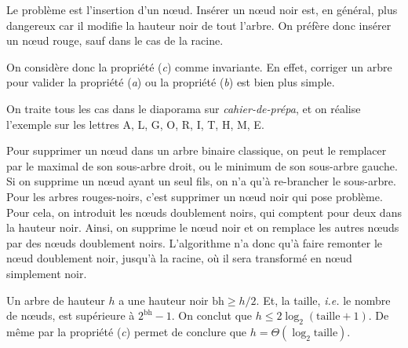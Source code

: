 {{		Le problème est l'insertion d'un nœud.
		Insérer un nœud noir est, en général, plus dangereux car il modifie la hauteur noir de tout l'arbre.
		On préfère donc insérer un nœud rouge, sauf dans le cas de la racine.
	
		On considère donc la propriété (\textit{c}) comme invariante. En effet, corriger un arbre pour valider la propriété (\textit{a}) ou la propriété (\textit{b}) est bien plus simple.
	
		On traite tous les cas dans le diaporama sur \textit{cahier-de-prépa}, et on réalise l'exemple sur les lettres A, L, G, O, R, I, T, H, M, E.
	
		\bigskip
		
		Pour supprimer un nœud dans un arbre binaire classique, on peut le remplacer par le maximal de son sous-arbre droit, ou le minimum de son sous-arbre gauche. Si on supprime un nœud ayant un seul fils, on n'a qu'à re-brancher le sous-arbre.
		Pour les arbres rouges-noirs, c'est supprimer un nœud noir qui pose problème.
		Pour cela, on introduit les nœuds doublement noirs, qui comptent pour deux dans la hauteur noir.
		Ainsi, on supprime le nœud noir et on remplace les autres nœuds par des nœuds doublement noirs.
		L'algorithme n'a donc qu'à faire remonter le nœud doublement noir, jusqu'à la racine, où il sera transformé en nœud simplement noir.
	
		Un arbre de hauteur $h$ a une hauteur noir $\mathrm{bh} \ge h / 2$. Et, la taille, \textit{i.e.} le nombre de nœuds, est supérieure à $2^{\mathrm{bh}} - 1$.
		On conclut que $h \le 2 \log_2(\mathrm{taille} + 1)$.
		De même par la propriété (\textit{c}) permet de conclure que $h = \Theta(\log_2 \mathrm{taille})$.
	}
	\def\addmacros#1{#1}
}
